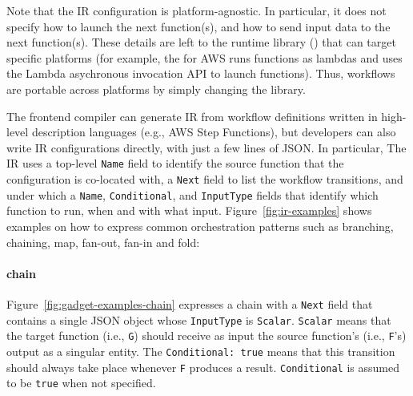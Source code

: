 Note that the IR configuration is platform-agnostic. In particular, it does
not specify how to launch the next function(s), and how to send input data to
the next function(s). These details are left to the \name{} runtime library
(\deorc{}) that can target specific platforms (for example, the \deorc{} for
AWS runs functions as lambdas and uses the Lambda asychronous invocation API
to launch functions). Thus, workflows are portable across platforms by simply
changing the \deorc{} library.

The \name{} frontend compiler can generate IR from workflow definitions
written in high-level description languages (e.g., AWS Step Functions), but
developers can also write IR configurations directly, with just a few lines of
JSON. In particular, The \name{} IR uses a top-level \texttt{Name} field to
identify the source function that the configuration is co-located with, a
\texttt{Next} field to list the workflow transitions, and under which a
\texttt{Name}, \texttt{Conditional}, and \texttt{InputType} fields that
identify which function to run, when and with what input.
Figure~\ref{fig:ir-examples} shows examples on how to express common
orchestration patterns such as branching, chaining, map, fan-out, fan-in and
fold: 



\paragraph{chain}


Figure~\ref{fig:gadget-examples-chain} expresses a chain with a \texttt{Next}
field that contains a single JSON object whose \texttt{InputType} is
\texttt{Scalar}. \texttt{Scalar} means that the target function (i.e.,
\texttt{G}) should receive as input the source function's (i.e., \texttt{F}'s)
output as a singular entity. The \texttt{Conditional: true} means that this
transition should always take place whenever \texttt{F} produces a result.
\texttt{Conditional} is assumed to be \texttt{true} when not specified.

